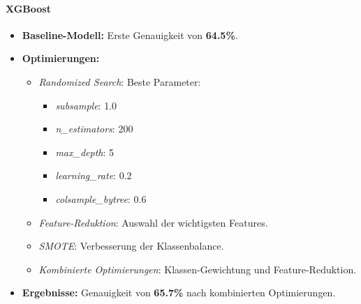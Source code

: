 \documentclass[a4paper,12pt]{article}
\begin{document}
\paragraph{XGBoost}
\begin{itemize}
    \item \textbf{Baseline-Modell:} Erste Genauigkeit von \textbf{64.5\%}.
    \item \textbf{Optimierungen:}
    \begin{itemize}
        \item \textit{Randomized Search}: Beste Parameter:
        \begin{itemize}
            \item \textit{subsample}: 1.0
            \item \textit{n\_estimators}: 200
            \item \textit{max\_depth}: 5
            \item \textit{learning\_rate}: 0.2
            \item \textit{colsample\_bytree}: 0.6
        \end{itemize}
        \item \textit{Feature-Reduktion}: Auswahl der wichtigsten Features.
        \item \textit{SMOTE}: Verbesserung der Klassenbalance.
        \item \textit{Kombinierte Optimierungen}: Klassen-Gewichtung und Feature-Reduktion.
    \end{itemize}
    \item \textbf{Ergebnisse:} Genauigkeit von \textbf{65.7\%} nach kombinierten Optimierungen.
\end{itemize}
\end{document}
